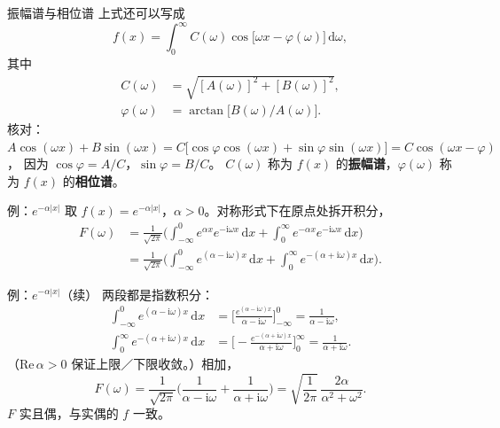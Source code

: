 \documentclass[fontset=windows, chinese, 10pt, xcolor=dvipsnames]{beamer}
\begin{document}
\begin{frame}{振幅谱与相位谱}
  上式还可以写成
  \begin{equation*}
    f(x)=\int_0^{\infty}
      C(\omega)\cos\bigl[\omega x-\varphi(\omega)\bigr]\,\mathrm{d}\omega,
  \end{equation*}
  其中
  \begin{align*}
    C(\omega)&=\sqrt{[A(\omega)]^2+[B(\omega)]^2},\\
    \varphi(\omega)&=\arctan\bigl[B(\omega)/A(\omega)\bigr].
  \end{align*}
  核对：$A\cos(\omega x)+B\sin(\omega x)
    =C\bigl[\cos\varphi\cos(\omega x)+\sin\varphi\sin(\omega x)\bigr]
    =C\cos(\omega x-\varphi)$，
  因为 $\cos\varphi=A/C$，$\sin\varphi=B/C$。
  $C(\omega)$ 称为 $f(x)$ 的\textbf{振幅谱}，$\varphi(\omega)$ 称为 $f(x)$ 的\textbf{相位谱}。
\end{frame}




\begin{frame}{例：$e^{-\alpha|x|}$}
  取 $f(x)=e^{-\alpha|x|}$，$\alpha>0$。对称形式下在原点处拆开积分，
  \begin{align*}
    F(\omega)
    &=\frac{1}{\sqrt{2\pi}}
      \Biggl(
        \int_{-\infty}^{0}
          e^{\alpha x}e^{-\mathrm{i}\omega x}\,\mathrm{d}x
        +\int_0^{\infty}
          e^{-\alpha x}e^{-\mathrm{i}\omega x}\,\mathrm{d}x
      \Biggr)
    \\
    &=\frac{1}{\sqrt{2\pi}}
      \Biggl(
        \int_{-\infty}^{0}
          e^{(\alpha-\mathrm{i}\omega)x}\,\mathrm{d}x
        +\int_0^{\infty}
          e^{-(\alpha+\mathrm{i}\omega)x}\,\mathrm{d}x
      \Biggr).
  \end{align*}
\end{frame}

\begin{frame}{例：$e^{-\alpha|x|}$（续）}
  两段都是指数积分：
  \begin{align*}
    \int_{-\infty}^{0} e^{(\alpha-\mathrm{i}\omega)x}\,\mathrm{d}x
    &=\Biggl[
      \frac{e^{(\alpha-\mathrm{i}\omega)x}}{\alpha-\mathrm{i}\omega}
    \Biggr]_{-\infty}^{0}
    =\frac{1}{\alpha-\mathrm{i}\omega},
    \\
    \int_0^{\infty} e^{-(\alpha+\mathrm{i}\omega)x}\,\mathrm{d}x
    &=\Biggl[
      -\frac{e^{-(\alpha+\mathrm{i}\omega)x}}{\alpha+\mathrm{i}\omega}
    \Biggr]_0^{\infty}
    =\frac{1}{\alpha+\mathrm{i}\omega}.
  \end{align*}
  （$\mathrm{Re}\,\alpha>0$ 保证上限／下限收敛。）相加，
  \begin{equation*}
    F(\omega)
    =\frac{1}{\sqrt{2\pi}}
      \Biggl(
        \frac{1}{\alpha-\mathrm{i}\omega}
        +\frac{1}{\alpha+\mathrm{i}\omega}
      \Biggr)
    =\sqrt{\frac{1}{2\pi}}\,\frac{2\alpha}{\alpha^2+\omega^2}.
  \end{equation*}
  $F$ 实且偶，与实偶的 $f$ 一致。
\end{frame}
\end{document}
